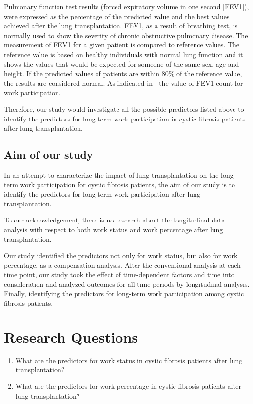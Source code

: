 \documentclass[11pt, a4paper]{article}\usepackage[]{graphicx}\usepackage[]{color}
\begin{document}
Pulmonary function test results (forced expiratory volume in one second [FEV1]), were expressed as the percentage of the predicted value and the best values achieved after the lung transplantation. FEV1, as a result of breathing test, is normally used to show the severity of chronic obstructive pulmonary disease. The measurement of FEV1 for a given patient is compared to reference values. The reference value is based on healthy individuals with normal lung function and it shows the values that would be expected for someone of the same sex, age and height. If the predicted values of patients are within 80\% of the reference value, the results are considered normal. As indicated in \cite{cicutto2004factors}, the value of FEV1 count for work participation.

Therefore, our study would investigate all the possible predictors listed above to identify the predictors for long-term work participation in cystic fibrosis patients after lung transplantation.


\subsection*{Aim of our study} 

In an attempt to characterize the impact of lung transplantation on the long-term work participation for cystic fibrosis patients, the aim of our study is to identify the predictors for long-term work participation after lung transplantation.

To our acknowledgement, there is no research about the longitudinal data analysis with respect to both work status and work percentage after lung transplantation. 

Our study identified the predictors not only for work status, but also for work percentage, as a compensation analysis. After the conventional analysis at each time point, our study took the effect of time-dependent factors and time into consideration and analyzed outcomes for all time periods by longitudinal analysis. Finally, identifying the predictors for long-term work participation among cystic fibrosis patients.


 
\vspace{1cm}
\section{Research Questions} \label{sec:questions}
\begin{enumerate}
    \item What are the predictors for work status in cystic fibrosis patients after lung transplantation?
    \item What are the predictors for work percentage in cystic fibrosis patients after lung transplantation?
\end{enumerate}
\vspace{1cm}
\end{document}
